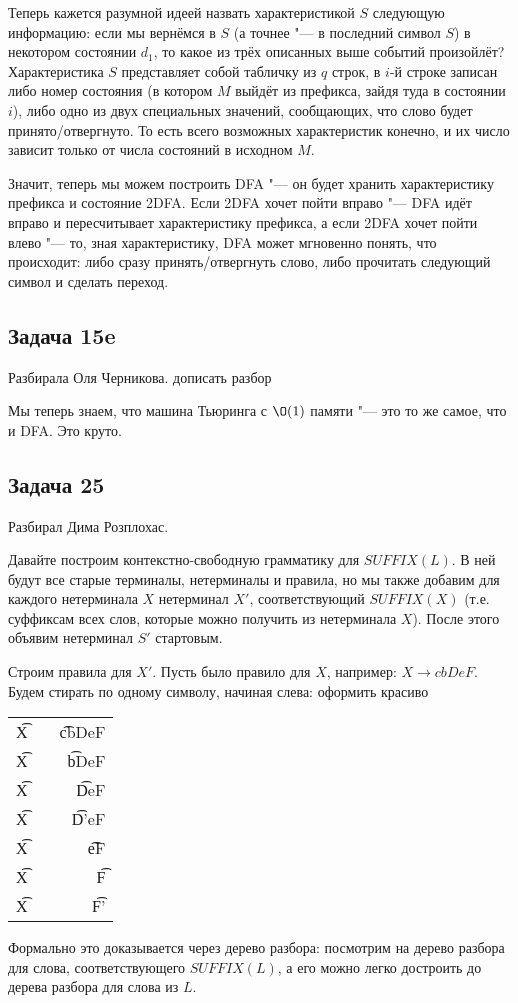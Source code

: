 	Теперь кажется разумной идеей назвать характеристикой $S$ следующую информацию:
	если мы вернёмся в $S$ (а точнее "--- в последний символ $S$) в некотором состоянии $d_1$,
	то какое из трёх описанных выше событий произойлёт?
	Характеристика $S$ представляет собой табличку из $q$ строк, в $i$-й строке записан либо
	номер состояния (в котором $M$ выйдёт из префикса, зайдя туда в состоянии $i$), либо
	одно из двух специальных значений, сообщающих, что слово будет принято/отвергнуто.
	То есть всего возможных характеристик конечно, и их число зависит только от числа состояний в
	исходном $M$.

	Значит, теперь мы можем построить DFA "--- он будет хранить характеристику префикса и состояние 2DFA.
	Если 2DFA хочет пойти вправо "--- DFA идёт вправо и пересчитывает характеристику префикса,
	а если 2DFA хочет пойти влево "--- то, зная характеристику, DFA может мгновенно понять, что происходит:
	либо сразу принять/отвергнуть слово, либо прочитать следующий символ и сделать переход.

\subsection{Задача 15e}
	Разбирала Оля Черникова.
	\TODO дописать разбор

	\begin{Rem}
		Мы теперь знаем, что машина Тьюринга с $\O(1)$ памяти "--- это то же самое,
		что и DFA.
		Это круто.
	\end{Rem}

\subsection{Задача 25}
	Разбирал Дима Розплохас.

	Давайте построим контекстно-свободную грамматику для $SUFFIX(L)$.
	В ней будут все старые терминалы, нетерминалы и правила, но мы также
	добавим для каждого нетерминала $X$ нетерминал $X'$, соответствующий $SUFFIX(X)$
	(т.е. суффиксам всех слов, которые можно получить из нетерминала $X$).
	После этого объявим нетерминал $S'$ стартовым.

	Строим правила для $X'$.
	Пусть было правило для $X$, например: $X \to cbDeF$.
	Будем стирать по одному символу, начиная слева:
	\TODO оформить красиво
	\begin{tabular}{rcr}
		\t{X} &\to& \t{cbDeF} \\
		\t{X} &\to&  \t{bDeF} \\
		\t{X} &\to&   \t{DeF} \\
		\t{X} &\to&  \t{D'eF} \\
		\t{X} &\to&    \t{eF} \\
		\t{X} &\to&     \t{F} \\
		\t{X} &\to&    \t{F'} \\
	\end{tabular}
	Формально это доказывается через дерево разбора: посмотрим на дерево разбора для слова,
	соответствующего $SUFFIX(L)$, а его можно легко достроить до дерева разбора для слова из $L$.

